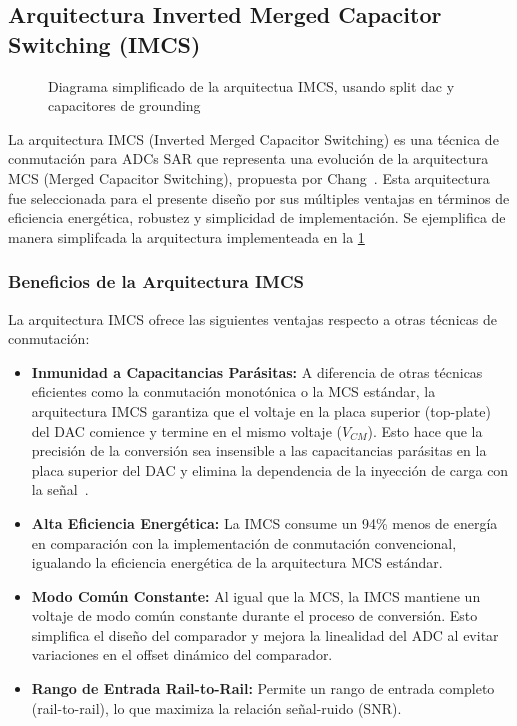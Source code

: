 \documentclass[12pt,a4paper]{report}
\begin{document}
\subsection{Arquitectura Inverted Merged Capacitor Switching (IMCS)}
\begin{figure}[H]
    \centering
    
    \caption{Diagrama simplificado de la arquitectua IMCS, usando split dac y capacitores de grounding}
    \label{cdac_simp}
\end{figure}
La arquitectura IMCS (Inverted Merged Capacitor Switching) es una técnica de conmutación para ADCs SAR que representa una evolución de la arquitectura MCS (Merged Capacitor Switching), propuesta por Chang~\cite{chang_sar_thesis}. Esta arquitectura fue seleccionada para el presente diseño por sus múltiples ventajas en términos de eficiencia energética, robustez y simplicidad de implementación. Se ejemplifica de manera simplifcada la arquitectura implementeada en la \cref{cdac_simp}

\subsubsection{Beneficios de la Arquitectura IMCS}

La arquitectura IMCS ofrece las siguientes ventajas respecto a otras técnicas de conmutación:

\begin{itemize}
    \item \textbf{Inmunidad a Capacitancias Parásitas:} A diferencia de otras técnicas eficientes como la conmutación monotónica o la MCS estándar, la arquitectura IMCS garantiza que el voltaje en la placa superior (top-plate) del DAC comience y termine en el mismo voltaje ($V_{CM}$). Esto hace que la precisión de la conversión sea insensible a las capacitancias parásitas en la placa superior del DAC y elimina la dependencia de la inyección de carga con la señal~\cite{chang_sar_thesis}.
    
    \item \textbf{Alta Eficiencia Energética:} La IMCS consume un 94\% menos de energía en comparación con la implementación de conmutación convencional, igualando la eficiencia energética de la arquitectura MCS estándar.
    
    \item \textbf{Modo Común Constante:} Al igual que la MCS, la IMCS mantiene un voltaje de modo común constante durante el proceso de conversión. Esto simplifica el diseño del comparador y mejora la linealidad del ADC al evitar variaciones en el offset dinámico del comparador.
    
    \item \textbf{Rango de Entrada Rail-to-Rail:} Permite un rango de entrada completo (rail-to-rail), lo que maximiza la relación señal-ruido (SNR).
\end{itemize}
\end{document}
